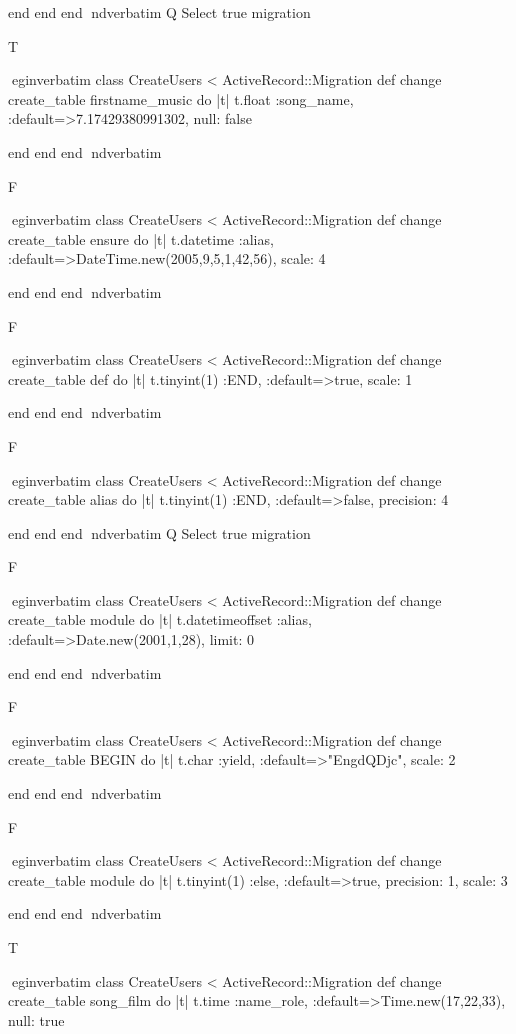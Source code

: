     end 
  end 
end
nd{verbatim}
Q
 Select true migration

T

egin{verbatim}
 class CreateUsers < ActiveRecord::Migration 
  def change 
    create_table firstname_music do |t| 
      t.float :song_name, :default=>7.17429380991302, null: false
    
    end 
  end 
end
nd{verbatim}

F

egin{verbatim}
 class CreateUsers < ActiveRecord::Migration 
  def change 
    create_table ensure do |t| 
      t.datetime :alias, :default=>DateTime.new(2005,9,5,1,42,56), scale: 4
    
    end 
  end 
end
nd{verbatim}

F

egin{verbatim}
 class CreateUsers < ActiveRecord::Migration 
  def change 
    create_table def do |t| 
      t.tinyint(1) :END, :default=>true, scale: 1
    
    end 
  end 
end
nd{verbatim}

F

egin{verbatim}
 class CreateUsers < ActiveRecord::Migration 
  def change 
    create_table alias do |t| 
      t.tinyint(1) :END, :default=>false, precision: 4
    
    end 
  end 
end
nd{verbatim}
Q
 Select true migration

F

egin{verbatim}
 class CreateUsers < ActiveRecord::Migration 
  def change 
    create_table module do |t| 
      t.datetimeoffset :alias, :default=>Date.new(2001,1,28), limit: 0
    
    end 
  end 
end
nd{verbatim}

F

egin{verbatim}
 class CreateUsers < ActiveRecord::Migration 
  def change 
    create_table BEGIN do |t| 
      t.char :yield, :default=>"EngdQDjc", scale: 2
    
    end 
  end 
end
nd{verbatim}

F

egin{verbatim}
 class CreateUsers < ActiveRecord::Migration 
  def change 
    create_table module do |t| 
      t.tinyint(1) :else, :default=>true, precision: 1, scale: 3
    
    end 
  end 
end
nd{verbatim}

T

egin{verbatim}
 class CreateUsers < ActiveRecord::Migration 
  def change 
    create_table song_film do |t| 
      t.time :name_role, :default=>Time.new(17,22,33), null: true
    
